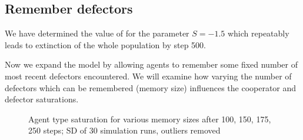 \documentclass[english]{article}
\begin{document}
\subsection{Remember defectors}
We have determined the value of for the parameter $S = -1.5$ which repeatably leads to extinction of the whole population by step 500.

Now we expand the model by allowing agents to remember some fixed number of most recent defectors encountered. We will examine how varying the number of defectors which can be remembered (memory size) influences the cooperator and defector saturations.

\begin{figure}[!ht]
  \centering
  \caption{Agent type saturation for various memory sizes after 100, 150, 175, 250 steps; SD of 30 simulation runs, outliers removed}
  \label{fig:agent_sat/memory_size}
\end{figure}
\end{document}
